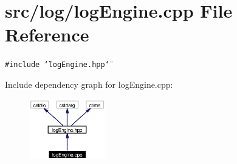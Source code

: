\section{src/log/log\-Engine.cpp File Reference}
\label{logEngine_8cpp}
{\tt \#include \char`\"{}log\-Engine.hpp\char`\"{}}\par


Include dependency graph for log\-Engine.cpp:\begin{figure}[H]
\begin{center}
\leavevmode
\includegraphics[width=94pt]{logEngine_8cpp__incl}
\end{center}
\end{figure}

